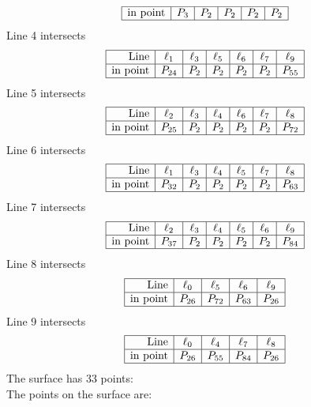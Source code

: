 \documentclass{article}
\begin{document}
{$$\begin{array}{|r*{5}{|c}|}
\hline
\mbox{in point}  & P_{3} & P_{2} & P_{2} & P_{2} & P_{2}\\
\hline
\end{array}
$$
Line 4 intersects 
$$
\begin{array}{|r*{6}{|c}|}
\hline
\mbox{Line}  & \ell_{1} & \ell_{3} & \ell_{5} & \ell_{6} & \ell_{7} & \ell_{9}\\
\hline
\mbox{in point}  & P_{24} & P_{2} & P_{2} & P_{2} & P_{2} & P_{55}\\
\hline
\end{array}
$$
Line 5 intersects 
$$
\begin{array}{|r*{6}{|c}|}
\hline
\mbox{Line}  & \ell_{2} & \ell_{3} & \ell_{4} & \ell_{6} & \ell_{7} & \ell_{8}\\
\hline
\mbox{in point}  & P_{25} & P_{2} & P_{2} & P_{2} & P_{2} & P_{72}\\
\hline
\end{array}
$$
Line 6 intersects 
$$
\begin{array}{|r*{6}{|c}|}
\hline
\mbox{Line}  & \ell_{1} & \ell_{3} & \ell_{4} & \ell_{5} & \ell_{7} & \ell_{8}\\
\hline
\mbox{in point}  & P_{32} & P_{2} & P_{2} & P_{2} & P_{2} & P_{63}\\
\hline
\end{array}
$$
Line 7 intersects 
$$
\begin{array}{|r*{6}{|c}|}
\hline
\mbox{Line}  & \ell_{2} & \ell_{3} & \ell_{4} & \ell_{5} & \ell_{6} & \ell_{9}\\
\hline
\mbox{in point}  & P_{37} & P_{2} & P_{2} & P_{2} & P_{2} & P_{84}\\
\hline
\end{array}
$$
Line 8 intersects 
$$
\begin{array}{|r*{4}{|c}|}
\hline
\mbox{Line}  & \ell_{0} & \ell_{5} & \ell_{6} & \ell_{9}\\
\hline
\mbox{in point}  & P_{26} & P_{72} & P_{63} & P_{26}\\
\hline
\end{array}
$$
Line 9 intersects 
$$
\begin{array}{|r*{4}{|c}|}
\hline
\mbox{Line}  & \ell_{0} & \ell_{4} & \ell_{7} & \ell_{8}\\
\hline
\mbox{in point}  & P_{26} & P_{55} & P_{84} & P_{26}\\
\hline
\end{array}
$$
The surface has 33 points:\\
The points on the surface are:\\
}
\end{document}
